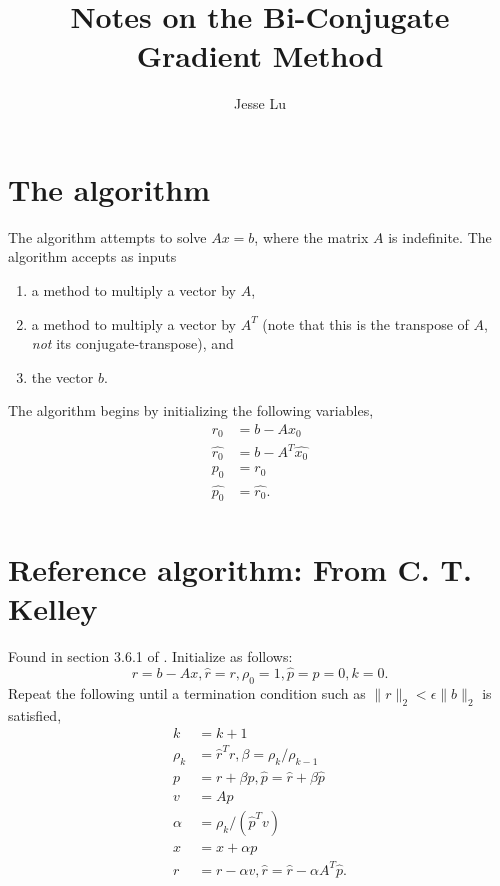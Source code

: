 \documentclass{article}
\title{Notes on the Bi-Conjugate Gradient Method}
\author{Jesse Lu}
\begin{document}
\maketitle
\tableofcontents
\section{The algorithm}
The algorithm attempts to solve $Ax = b$,
    where the matrix $A$ is indefinite.
The algorithm accepts as inputs
    \begin{enumerate}
    \item a method to multiply a vector by $A$,
    \item a method to multiply a vector by $A^T$ 
        (note that this is the transpose of $A$, 
        \emph{not} its conjugate-transpose), and
    \item the vector $b$.
    \end{enumerate}

The algorithm begins by initializing the following variables,
    \begin{subequations}\begin{align}
    r_0 &= b - Ax_0 \\
    \hat{r_0} &= b - A^T \hat{x_0} \\
    p_0 &= r_0 \\
    \hat{p_0} &= \hat{r_0}.
    \end{align}\end{subequations}
    \begin{subequations}\begin{align}
    \end{align}\end{subequations}


\appendix
\section{Reference algorithm: From C. T. Kelley}
Found in section 3.6.1 of \cite{kelley}.
Initialize as follows:
\begin{equation}
r = b - Ax, \hat{r} = r, \rho_0 = 1, \hat{p} = p = 0, k = 0.
\end{equation}
Repeat the following until a termination condition 
    such as $\|r\|_2 < \epsilon \|b\|_2$ is satisfied,
    \begin{subequations}\begin{align}
    k &= k + 1 \\
    \rho_k &= \hat{r}^T r, \beta = \rho_k / \rho_{k-1} \\
    p &= r + \beta p, \hat{p} = \hat{r} + \beta \hat{p} \\
    v &= Ap \\
    \alpha &= \rho_k / (\hat{p}^T v) \\
    x &= x + \alpha p \\
    r &= r - \alpha v, \hat{r} = \hat{r} - \alpha A^T \hat{p}.
    \end{align}\end{subequations}
\end{document}
